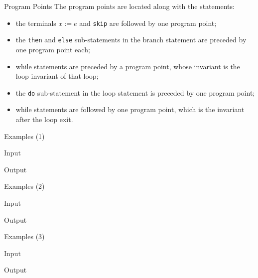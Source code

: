 \begin{frame}{Program Points}
    The program points are located along with the statements:
    \begin{itemize}
        \item the terminals $x\mathtt{ := }e$ and \texttt{skip} are followed by one program point;
        \item the \texttt{then} and \texttt{else} sub-statements in the branch statement are preceded by one program point each;
        \item while statements are preceded by a program point, whose invariant is the loop invariant of that loop;
        \item the \texttt{do} sub-statement in the loop statement is preceded by one program point;
        \item while statements are followed by one program point, which is the invariant after the loop exit.
    \end{itemize}
\end{frame}

\begin{frame}[fragile]{Examples (1)}
    \begin{block}{Input}
        \small
    \end{block}
    \begin{block}{Output}
        \small
    \end{block}
\end{frame}

\begin{frame}[fragile]{Examples (2)}
    \begin{block}{Input}
        \small
    \end{block}
    \begin{block}{Output}
        \small
    \end{block}
\end{frame}

\begin{frame}[fragile]{Examples (3)}
    \begin{block}{Input}
        \small
    \end{block}
    \begin{block}{Output}
        \small
    \end{block}
\end{frame}